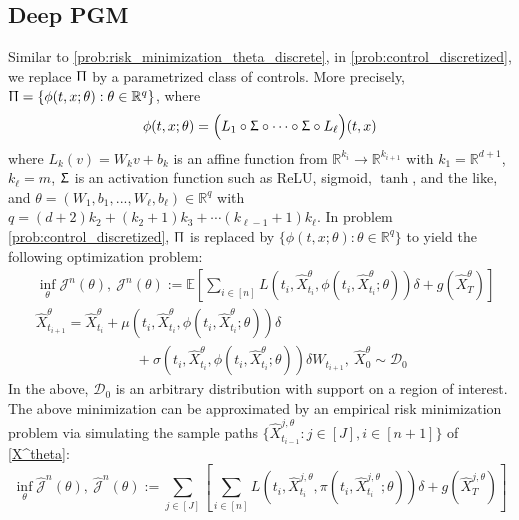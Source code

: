 \documentclass{article}
\numberwithin{equation}{section}
\begin{document}
\subsection{Deep PGM}
Similar to \eqref{prob:risk_minimization_theta_discrete}, in \eqref{prob:control_discretized}, we replace $\Uppi$ by a parametrized class of controls. More precisely, $\Uppi=\{\phi(t,x;\theta):\theta\in \mathbb{R}^q\}$, where
\begin{equation}\label{eqn:deepnn}
    \phi(t,x;\theta)=\Big(L_1\circ \Upsigma \circ\cdots \circ \Upsigma \circ L_\ell\Big)(t,x)
\end{equation}
where $L_k(v) = W_kv+b_k$ is an affine function from $\mathbb{R}^{k_i}\to \mathbb{R}^{k_{i+1}}$ with $k_1=\mathbb{R}^{d+1}$, $k_\ell=m$,  $\Upsigma$ is an activation function such as ReLU, sigmoid, $\tanh$, and the like,  and $\theta=(W_1,b_1,...,W_\ell,b_\ell)\in\mathbb{R}^q$ with $q = (d+2) k_2 + (k_2+1)k_3+\cdots (k_{\ell-1}+1)k_\ell$.
In problem \eqref{prob:control_discretized}, $\Uppi$ is replaced by $\{\phi(t,x;\theta):\theta\in\mathbb{R}^q\}$ to yield the following optimization problem:
\begin{align}
    &\inf_{\theta}\mathcal{J}^{n}(\theta),~\mathcal{J}^{n}(\theta):=\mathbb{E}\left[\sum_{i\in[n]}L(t_{i},\hat{X}^\theta_{t_{i}},\phi(t_{i},\hat{X}^\theta_{t_{i}};\theta))\delta + g(\hat{X}_T^\theta)\right] \label{prob:risk_minimization_theta}\\
   & \hat{X}^\theta_{t_{i+1}}=\hat{X}^\theta_{t_{i}}+\mu({t_{i}},\hat{X}_{t_{i}}^\theta,\phi(t_{i},\hat{X}^\theta_{t_{i}};\theta))\delta\nonumber\\
   &\hspace{3cm}+\sigma({t_{i}},\hat{X}_{t_{i}}^\theta,\phi(t_{i},\hat{X}^\theta_{t_{i}};\theta))\delta W_{{t_{i+1}}},~\hat{X}_0^\theta\sim\mathcal{D}_0\label{X^theta}
\end{align}
In the above, $\mathcal{D}_0$ is an arbitrary distribution with support on a region of interest.
The above minimization can be approximated by an empirical risk minimization problem via simulating the sample paths $\{\hat{X}_{t_{i-1}}^{j,\theta}:j\in[J], i\in[n+1]\}$ of 
 \eqref{X^theta}:
\begin{equation}\label{prob:empirical_risk_minimization_theta}
    \inf_{\theta}\hat{\mathcal{J}}^{n}(\theta),~\hat{\mathcal{J}}^{n}(\theta):=\sum_{j\in[J]}\left[\sum_{i\in[n]}L(t_{i},\hat{X}^{j,\theta}_{t_{i}},\pi(t_{i},\hat{X}^{j,\theta}_{t_{i}};\theta))\delta + g(\hat{X}_T^{j,\theta})\right]
\end{equation}
\end{document}
